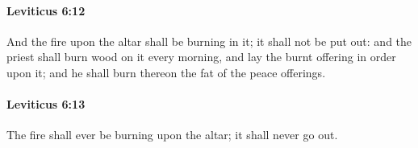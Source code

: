 		\paragraph{Leviticus 6:12} %
			\label{LEVITICUS-6-12}

			And the fire upon the altar shall be burning in it; it shall not be put out: and the priest shall burn wood on it every morning, and lay the burnt offering in order upon it; and he shall burn thereon the fat of the peace offerings.


		\paragraph{Leviticus 6:13} %
			\label{LEVITICUS-6-13}

			The fire shall ever be burning upon the altar; it shall never go out.


